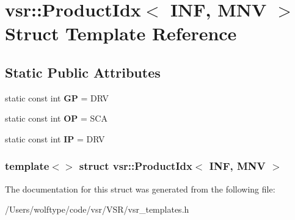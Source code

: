 \hypertarget{structvsr_1_1_product_idx_3_01_i_n_f_00_01_m_n_v_01_4}{\section{vsr\-:\-:Product\-Idx$<$ I\-N\-F, M\-N\-V $>$ Struct Template Reference}
\label{structvsr_1_1_product_idx_3_01_i_n_f_00_01_m_n_v_01_4}
}
\subsection*{Static Public Attributes}
\begin{DoxyCompactItemize}
\item 
\hypertarget{structvsr_1_1_product_idx_3_01_i_n_f_00_01_m_n_v_01_4_ab426aa49e29e35d9d87779c8886a68ca}{static const int {\bfseries G\-P} = D\-R\-V}\label{structvsr_1_1_product_idx_3_01_i_n_f_00_01_m_n_v_01_4_ab426aa49e29e35d9d87779c8886a68ca}

\item 
\hypertarget{structvsr_1_1_product_idx_3_01_i_n_f_00_01_m_n_v_01_4_a6b85d89ef1cde79e61da0bc219a64547}{static const int {\bfseries O\-P} = S\-C\-A}\label{structvsr_1_1_product_idx_3_01_i_n_f_00_01_m_n_v_01_4_a6b85d89ef1cde79e61da0bc219a64547}

\item 
\hypertarget{structvsr_1_1_product_idx_3_01_i_n_f_00_01_m_n_v_01_4_a3f43821400fabd43ff496b1af52714d9}{static const int {\bfseries I\-P} = D\-R\-V}\label{structvsr_1_1_product_idx_3_01_i_n_f_00_01_m_n_v_01_4_a3f43821400fabd43ff496b1af52714d9}

\end{DoxyCompactItemize}
\subsubsection*{template$<$$>$ struct vsr\-::\-Product\-Idx$<$ I\-N\-F, M\-N\-V $>$}



The documentation for this struct was generated from the following file\-:\begin{DoxyCompactItemize}
\item 
/\-Users/wolftype/code/vsr/\-V\-S\-R/vsr\-\_\-templates.\-h\end{DoxyCompactItemize}
